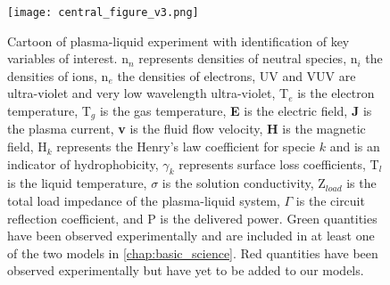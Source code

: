 \begin{figure}[htbp]
  \centering
  \texttt{[image: central\_figure\_v3.png]}
  \caption{Cartoon of plasma-liquid experiment with identification of key variables of interest. n$_n$ represents densities of neutral species, n$_i$ the densities of ions, n$_e$ the densities of electrons, UV and VUV are ultra-violet and very low wavelength ultra-violet, T$_e$ is the electron temperature, T$_g$ is the gas temperature, \textbf{E} is the electric field, \textbf{J} is the plasma current, \textbf{v} is the fluid flow velocity, \textbf{H} is the magnetic field, H$_k$ represents the Henry's law coefficient for specie $k$ and is an indicator of hydrophobicity, $\gamma_k$ represents surface loss coefficients, T$_l$ is the liquid temperature, $\sigma$ is the solution conductivity, Z$_{load}$ is the total load impedance of the plasma-liquid system, $\Gamma$ is the circuit reflection coefficient, and P is the delivered power. Green quantities have been observed experimentally and are included in at least one of the two models in \cref{chap:basic_science}. Red quantities have been observed experimentally but have yet to be added to our models.}
  \label{fig:central}
\end{figure}

